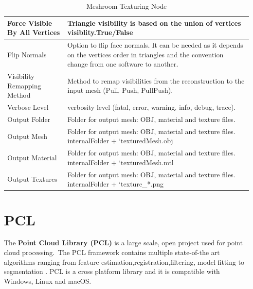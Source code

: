 \documentclass[12pt]{report}
\begin{document}
\begin{table}[h!]
{\begin{tabular}{|l|l|}
  Force Visible By All Vertices   & Triangle visibility is based on the union of vertices visiblity.True/False                     \\ \hline
  Flip Normals &
    Option to flip face normals. It can be needed as it depends on  the vertices order in triangles and the convention change from one  software to another. \\ \hline
  Visibility Remapping Method     & Method to remap visibilities from the reconstruction to the input mesh (Pull, Push, PullPush). \\ \hline
  Verbose Level                   & verbosity level (fatal, error, warning, info, debug, trace).                                   \\ \hline
  Output Folder                   & Folder for output mesh: OBJ, material and texture files.                                       \\ \hline
  Output Mesh                     & Folder for output mesh: OBJ, material and texture files. internalFolder + ‘texturedMesh.obj    \\ \hline
  Output Material                 & Folder for output mesh: OBJ, material and texture files. internalFolder + ‘texturedMesh.mtl    \\ \hline
  Output Textures                 & Folder for output mesh: OBJ, material and texture files. internalFolder + ‘texture\_*.png      \\ \hline
  \end{tabular}%
  }
  \caption{Meshroom Texturing Node}
  \label{tab:Texturing}
  \end{table}


\section{PCL}
\label{section:pcl}
The \textbf{Point Cloud Library (PCL)} is a large scale, open project used for point cloud processing.\
The PCL framework contains multiple state-of-the art algorithms ranging from feature estimation,registration,filtering, model fitting to segmentation . 
PCL is a cross platform library and it is compatible with Windows, Linux and macOS.
\end{document}
